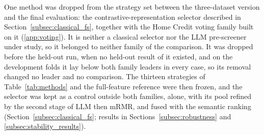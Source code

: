 \documentclass[final,5p,twocolumn]{elsarticle}
\begin{document}
One method was dropped from the strategy set between the three-dataset version and the final evaluation: the contrastive-representation selector described in Section~\ref{subsec:classical_fs}, together with the Home Credit voting family built on it (\ref{app:voting}). It is neither a classical selector nor the LLM pre-screener under study, so it belonged to neither family of the comparison. It was dropped before the held-out run, when no held-out result of it existed, and on the development folds it lay below both family leaders in every case, so its removal changed no leader and no comparison. The thirteen strategies of Table~\ref{tab:methods} and the full-feature reference were then frozen, and the selector was kept as a control outside both families, alone, with its pool refined by the second stage of LLM then mRMR, and fused with the semantic ranking (Section~\ref{subsec:classical_fs}; results in Sections~\ref{subsec:robustness} and \ref{subsec:stability_results}).
\end{document}
